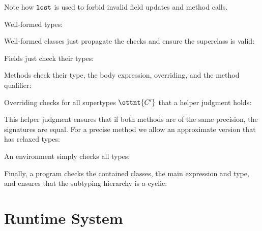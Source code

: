 Note how $ \texttt{\upshape{lost}\,\!} $ is used to forbid invalid field updates and method
calls.


Well-formed types:

\vspace{0.5ex}
\ottdefnwftype{}
\vspace{2.0ex}


Well-formed classes just propagate the checks and ensure the
superclass is valid:

\vspace{0.5ex}
\ottdefnwfclass{}
\vspace{2.0ex}


Fields just check their types:

\vspace{0.5ex}
\ottdefnwffd{}
\vspace{2.0ex}


Methods check their type, the body expression, overriding, and the
method qualifier:

\vspace{0.5ex}
\ottdefnwfmd{}
\vspace{2.0ex}


Overriding checks for all supertypes $\ottnt{C'}$ that a helper judgment
holds:

\vspace{0.5ex}
\ottdefnoverride{}
\vspace{2.0ex}


This helper judgment ensures that if both methods are of the same
precision, the signatures are equal. For a precise method we allow an
approximate version that has relaxed types:

\vspace{0.5ex}
\ottdefnoverrideaux{}
\vspace{2.0ex}


An environment simply checks all types:

\vspace{0.5ex}
\ottdefnswfenv{}
\vspace{2.0ex}


Finally, a program checks the contained classes, the main expression
and type, and ensures that the subtyping hierarchy is a-cyclic:

\vspace{0.5ex}
\ottdefnwfprg{}
\vspace{2.0ex}



\section{Runtime System}
\label{enerj:rt}

